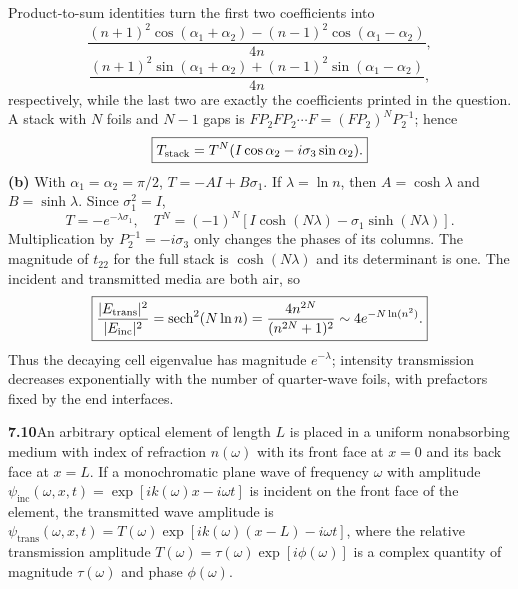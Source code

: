 Product-to-sum identities turn the first two coefficients into
\[
\frac{(n+1)^2\cos(\alpha_1+\alpha_2)
       -(n-1)^2\cos(\alpha_1-\alpha_2)}{4n},
\]
\[
\frac{(n+1)^2\sin(\alpha_1+\alpha_2)
       +(n-1)^2\sin(\alpha_1-\alpha_2)}{4n},
\]
respectively, while the last two are exactly the coefficients
printed in the question. A stack with $N$ foils and $N-1$ gaps is
$F P_2 F P_2\cdots F=(FP_2)^NP_2^{-1}$; hence
\[
\boxed{T_{\rm stack}=T^N(I\cos\alpha_2-i\sigma_3\sin\alpha_2).}
\]
\textbf{(b)} With $\alpha_1=\alpha_2=\pi/2$,
$T=-AI+B\sigma_1$. If $\lambda=\ln n$, then
$A=\cosh\lambda$ and $B=\sinh\lambda$. Since $\sigma_1^2=I$,
\[
\boxed{T=-e^{-\lambda\sigma_1},\quad
T^N=(-1)^N[I\cosh(N\lambda)-\sigma_1\sinh(N\lambda)].}
\]
Multiplication by $P_2^{-1}=-i\sigma_3$ only changes the phases of
its columns. The magnitude of $t_{22}$ for the full stack is
$\cosh(N\lambda)$ and its determinant is one. The incident and
transmitted media are both air, so
\[
\boxed{\frac{|E_{\rm trans}|^2}{|E_{\rm inc}|^2}
=\operatorname{sech}^2(N\ln n)
=\frac{4n^{2N}}{(n^{2N}+1)^2}
\sim4e^{-N\ln(n^2)}.}
\]
Thus the decaying cell eigenvalue has magnitude $e^{-\lambda}$;
intensity transmission decreases exponentially with the number of
quarter-wave foils, with prefactors fixed by the end interfaces.

\par\bigskip
\noindent\textbf{7.10}\quad An arbitrary optical element of length $L$ is placed in a uniform nonabsorbing medium with index of refraction $n(\omega)$ with its front face at $x=0$ and its back face at $x=L$. If a monochromatic plane wave of frequency $\omega$ with amplitude $\psi_{\mathrm{inc}}(\omega,x,t)=\exp[ik(\omega)x-i\omega t]$ is incident on the front face of the element, the transmitted wave amplitude is $\psi_{\mathrm{trans}}(\omega,x,t)=T(\omega)\exp[ik(\omega)(x-L)-i\omega t]$, where the relative transmission amplitude $T(\omega)=\tau(\omega)\exp[i\phi(\omega)]$ is a complex quantity of magnitude $\tau(\omega)$ and phase $\phi(\omega)$.

